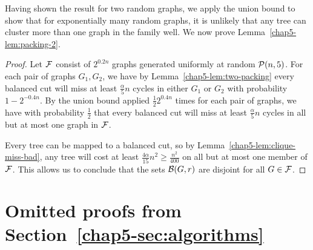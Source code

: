 Having shown the result for two random graphs, we apply the union bound to show that for exponentially many random graphs, it is unlikely that any tree can cluster more than one graph in the family well. We now prove Lemma~\ref{chap5-lem:packing-2}.

\begin{proof}
    Let $\mathcal{F}$ consist of $2^{0.2n}$ graphs generated uniformly at random $\mathcal{P}(n,5)$. For each pair of graphs $G_1, G_2$, we have by Lemma~\ref{chap5-lem:two-packing} every balanced cut will miss at least $\frac{\alpha}{5} n$ cycles in either $G_1$ or $G_2$ with probability $1-2^{-0.4n}$. By the union bound applied $\frac{1}{2}2^{0.4n}$ times for each pair of graphs, we have with probability $\frac{1}{2}$ that every balanced cut will miss at least $\frac{\alpha}{5} n$ cycles in all but at most one graph in $\mathcal{F}$.
    
    Every tree can be mapped to a balanced cut, so by Lemma~\ref{chap5-lem:clique-miss-bad}, any tree will cost at least $\frac{4\alpha}{15}n^2 \geq \frac{n^2}{400}$ on all but at most one member of $\mathcal{F}$. This allows us to conclude that the sets $\mathcal{B}(G,r)$ are disjoint for all $G \in \mathcal{F}$.
\end{proof}


\section{Omitted proofs from Section~\ref{chap5-sec:algorithms}}


